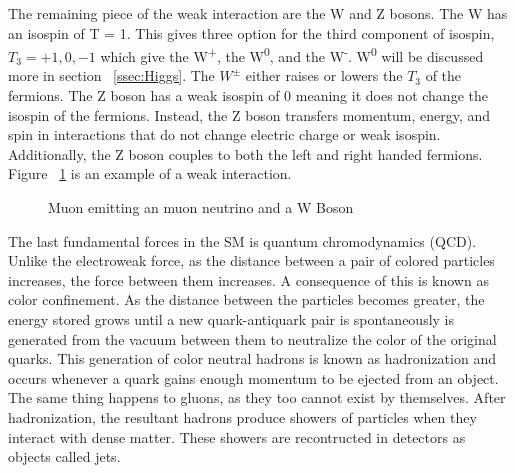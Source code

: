  \indent The remaining piece of the weak interaction are the W and Z bosons. The W has an isospin of T = 1. This gives three option for the third component of isospin, ${T_{3} = +1, 0, -1}$ which give the W\textsuperscript{+}, the W\textsuperscript{0}, and the W\textsuperscript{-}. W\textsuperscript{0} will be discussed more in section ~\ref{ssec:Higgs}. The ${W^{\pm}}$ either raises or lowers the ${T_{3}}$ of the fermions. The Z boson has a weak isospin of 0 meaning it does not change the isospin of the fermions. Instead, the Z boson transfers momentum, energy, and spin in interactions that do not change electric charge or weak isospin. Additionally, the Z boson couples to both the left and right handed fermions. Figure ~\ref{Fig:weak_dia} is an example of a weak interaction.\newline

\begin{figure}[h]
\begin{center}

\caption[Muon emitting a neutrino]{Muon emitting an muon neutrino and a W Boson}
\label{Fig:weak_dia}
\end{center}
\end{figure}


The last fundamental forces in the SM is quantum chromodynamics (QCD). %
 Unlike the electroweak force, as the distance between a pair of colored particles increases, the force between them increases. A consequence of this is known as color confinement. As the distance between the particles becomes greater, the energy stored grows until a new quark-antiquark pair is spontaneously is generated from the vacuum between them to neutralize the color of the original quarks. This generation of color neutral hadrons is known as hadronization and occurs whenever a quark gains enough momentum to be ejected from an object. The same thing happens to gluons, as they too cannot exist by themselves. After hadronization, the resultant hadrons produce showers of particles when they interact with dense matter. These showers are recontructed in detectors as objects called jets. 
